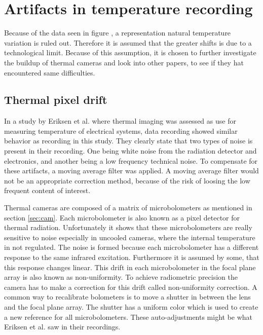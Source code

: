 \section{Artifacts in temperature recording}
\label{sec:artifacts}
Because of the data seen in figure , a representation natural temperature variation is ruled out. Therefore it is assumed that the greater shifts is due to a technological limit. Because of this assumption, it is chosen to further investigate the buildup of thermal cameras and look into other papers, to see if they hat encountered same difficulties.

\subsection{Thermal pixel drift}

In a study by Eriksen et al. where thermal imaging was assessed as use for measuring temperature of electrical systems, data recording showed similar behavior as recording in this study. They clearly state that two types of noise is present in their recording. One being white noise from the radiation detector and electronics, and another being a low frequency technical noise. To compensate for these artifacts, a moving average filter was applied.\cite{eriksen2014} A moving average filter would not be an appropriate correction method, because of the risk of loosing the low frequent content of interest. 


Thermal cameras are composed of a matrix of microbolometers as mentioned in section \cref{sec:cam}. Each microbolometer is also known as a pixel detector for thermal radiation.\cite{olbrycht2015,wolf2016} Unfortunately it shows that these microbolometers are really sensitive to noise especially in uncooled cameras, where the internal temperature in not regulated. The noise is formed because each microbolometer has a different response to the same infrared excitation. Furthermore it is assumed by some, that this response changes linear\cite{olbrycht2015}. This drift in each microbolometer in the focal plane array is also known as non-uniformity. To achieve radiometric precision the camera has to make a correction for this drift called non-uniformity correction. A common way to recalibrate bolometers is to move a shutter in between the lens and the focal plane array. The shutter has a uniform color which is used to create a new reference for all microbolometers.\cite{olbrycht2015,wolf2016} These auto-adjustments might be what Eriksen et al. saw in their recordings. 




